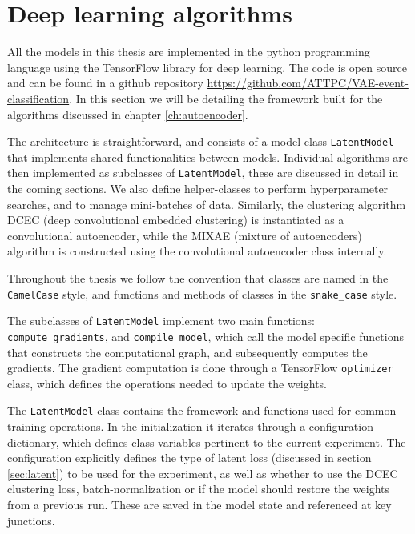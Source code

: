 \section{Deep learning algorithms}

All the models in this thesis are implemented in the python programming language using the TensorFlow library for deep learning. The code is open source and can be found in a github repository \url{https://github.com/ATTPC/VAE-event-classification}. In this section we will be detailing the framework built for the algorithms discussed in chapter \ref{ch:autoencoder}.

The architecture is straightforward, and consists of a model class \lstinline{LatentModel} that implements shared functionalities between models. Individual algorithms are then implemented as subclasses of \lstinline{LatentModel}, these are discussed in detail in the coming sections. We also define helper-classes to perform hyperparameter searches, and to manage mini-batches of data. Similarly, the clustering algorithm DCEC (deep convolutional embedded clustering) is instantiated as a convolutional autoencoder, while the MIXAE (mixture of autoencoders) algorithm is constructed using the convolutional autoencoder class internally. 

Throughout the thesis we follow the convention that classes are named in the \lstinline{CamelCase} style, and functions and methods of classes in the \lstinline{snake_case} style. 

The subclasses of \lstinline{LatentModel} implement two main functions: \lstinline{compute_gradients}, and \lstinline{compile_model}, which call the model specific functions that constructs the computational graph, and subsequently computes the gradients. The gradient computation is done through a TensorFlow \lstinline{optimizer} class, which defines the operations needed to update the weights. 

The \lstinline{LatentModel} class contains the framework and functions used for common training operations. In the initialization it iterates through a configuration dictionary, which defines class variables pertinent to the current experiment. The configuration explicitly defines the type of latent loss (discussed in section \ref{sec:latent}) to be used for the experiment, as well as whether to use the DCEC clustering loss, batch-normalization or if the model should restore the weights from a previous run. These are saved in the model state and referenced at key junctions.


